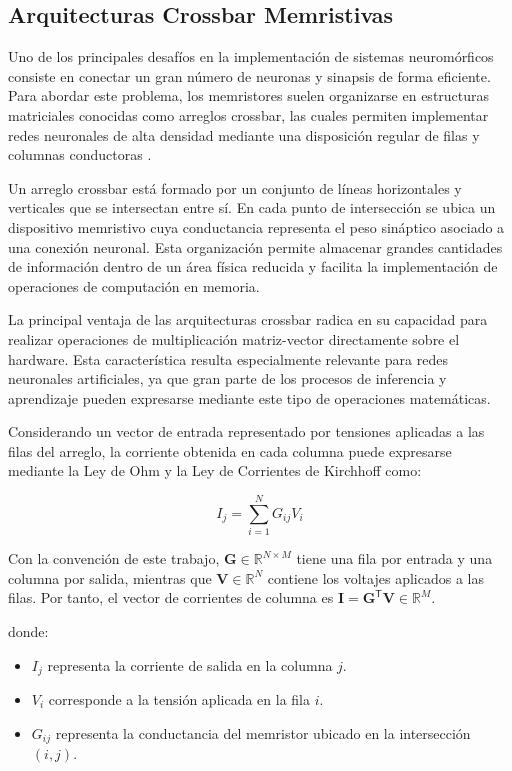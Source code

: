 \subsection{Arquitecturas Crossbar Memristivas}

Uno de los principales desafíos en la implementación de sistemas neuromórficos consiste en conectar un gran número de neuronas y sinapsis de forma eficiente. Para abordar este problema, los memristores suelen organizarse en estructuras matriciales conocidas como arreglos crossbar, las cuales permiten implementar redes neuronales de alta densidad mediante una disposición regular de filas y columnas conductoras \cite{4,5}.

Un arreglo crossbar está formado por un conjunto de líneas horizontales y verticales que se intersectan entre sí. En cada punto de intersección se ubica un dispositivo memristivo cuya conductancia representa el peso sináptico asociado a una conexión neuronal. Esta organización permite almacenar grandes cantidades de información dentro de un área física reducida y facilita la implementación de operaciones de computación en memoria.

La principal ventaja de las arquitecturas crossbar radica en su capacidad para realizar operaciones de multiplicación matriz-vector directamente sobre el hardware. Esta característica resulta especialmente relevante para redes neuronales artificiales, ya que gran parte de los procesos de inferencia y aprendizaje pueden expresarse mediante este tipo de operaciones matemáticas.

Considerando un vector de entrada representado por tensiones aplicadas a las filas del arreglo, la corriente obtenida en cada columna puede expresarse mediante la Ley de Ohm y la Ley de Corrientes de Kirchhoff como:

\begin{equation}
I_j=\sum_{i=1}^{N} G_{ij}V_i
\end{equation}

Con la convención de este trabajo, $\mathbf{G}\in\mathbb{R}^{N\times M}$
tiene una fila por entrada y una columna por salida, mientras que
$\mathbf{V}\in\mathbb{R}^{N}$ contiene los voltajes aplicados a las
filas. Por tanto, el vector de corrientes de columna es
$\mathbf{I}=\mathbf{G}^{\mathsf T}\mathbf{V}\in\mathbb{R}^{M}$.

donde:

\begin{itemize}
\item $I_j$ representa la corriente de salida en la columna $j$.
\item $V_i$ corresponde a la tensión aplicada en la fila $i$.
\item $G_{ij}$ representa la conductancia del memristor ubicado en la intersección $(i,j)$.
\end{itemize}

